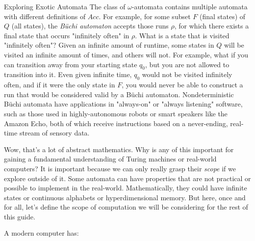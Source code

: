 \begin{bluebox}{Exploring Exotic Automata}
    The class of $\omega$-automata contains multiple automata with different definitions of $Acc$. For example, for some subset $F$ (final states) of $Q$ (all states), the \textit{B\"{u}chi automaton} accepts those runs $\rho$, for which there exists a final state that occurs "infinitely often" in $\rho$. What is a state that is visited "infinitely often"? Given an infinite amount of runtime, some states in $Q$ will be visited an infinite amount of times, and others will not. For example, what if you can transition away from your starting state $q_0$, but you are not allowed to transition into it. Even given infinite time, $q_0$ would not be visited infinitely often, and if it were the only state in $F$, you would never be able to construct a run that would be considered valid by a B\"{u}chi automaton. Nondeterministic B\"{u}chi automata have applications in "always-on" or "always listening" software, such as those used in highly-autonomous robots or smart speakers like the Amazon Echo, both of which receive instructions based on a never-ending, real-time stream of sensory data.
        
    Wow, that's a lot of abstract mathematics. Why is any of this important for gaining a fundamental understanding of Turing machines or real-world computers? It is important because we can only really grasp their \textit{scope} if we explore outside of it. Some automata can have properties that are not practical or possible to implement in the real-world. Mathematically, they could have infinite states or continuous alphabets or hyperdimensional memory. But here, once and for all, let's define the scope of computation we will be considering for the rest of this guide.
        
    A modern computer has:
    

\end{bluebox}
